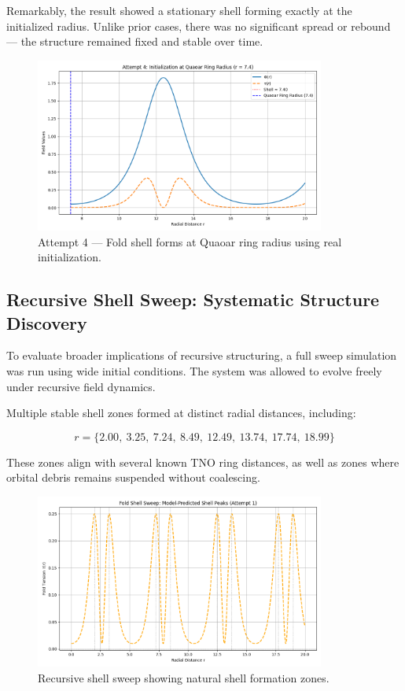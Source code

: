 \documentclass[12pt]{article}
\begin{document}
Remarkably, the result showed a stationary shell forming exactly at the initialized radius. Unlike prior cases, there was no significant spread or rebound — the structure remained fixed and stable over time.

\vspace{1em}
\begin{figure}[H]
  \centering
  \includegraphics[width=0.85\textwidth]{attempt_4_sim.png}
  \caption{Attempt 4 — Fold shell forms at Quaoar ring radius using real initialization.}
\end{figure}

\vspace{1em}
\FloatBarrier

\subsection{Recursive Shell Sweep: Systematic Structure Discovery}
To evaluate broader implications of recursive structuring, a full sweep simulation was run using wide initial conditions. The system was allowed to evolve freely under recursive field dynamics.

Multiple stable shell zones formed at distinct radial distances, including:

\[
r = \{ 2.00,\ 3.25,\ 7.24,\ 8.49,\ 12.49,\ 13.74,\ 17.74,\ 18.99 \}
\]

These zones align with several known TNO ring distances, as well as zones where orbital debris remains suspended without coalescing.

\vspace{1em}
\begin{figure}[H]
  \centering
  \includegraphics[width=0.85\textwidth]{fold_shell_sweep.png}
  \caption{Recursive shell sweep showing natural shell formation zones.}
\end{figure}
\end{document}
